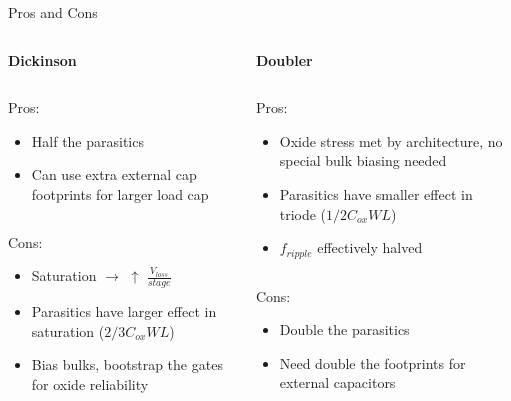 \documentclass[aspectratio=169]{beamer}
\begin{document}
\begin{frame}{Pros and Cons}
\begin{columns}[t]
    \begin{column}{0.5\linewidth}
        \textbf{Dickinson} \\
        \begin{column}{0.5\linewidth}
            Pros:
            \begin{itemize}
                \item Half the parasitics
                \item Can use extra external cap footprints for larger load cap
            \end{itemize}
        \end{column}
        \begin{column}{0.5\linewidth}
            Cons:
            \begin{itemize}
                \item Saturation $\rightarrow$ $\uparrow$ $\frac{V_{loss}}{stage}$
                \item Parasitics have larger effect in saturation ($2/3 C_{ox}WL$)
                \item Bias bulks, bootstrap the gates for oxide reliability
            \end{itemize}
        \end{column}
    \end{column}
    \begin{column}{0.5\linewidth}
        \textbf{Doubler} \\
        \begin{column}{0.5\linewidth}
            Pros:
            \begin{itemize}
                \item Oxide stress met by architecture, no special bulk biasing needed
                \item Parasitics have smaller effect in triode ($1/2 C_{ox}WL$)
                \item $f_{ripple}$ effectively halved
            \end{itemize}
        \end{column}
        \begin{column}{0.5\linewidth}
            Cons:
            \begin{itemize}
                \item Double the parasitics
                \item Need double the footprints for external capacitors
            \end{itemize}
        \end{column}
    \end{column}
\end{columns}    
\end{frame}
\end{document}
